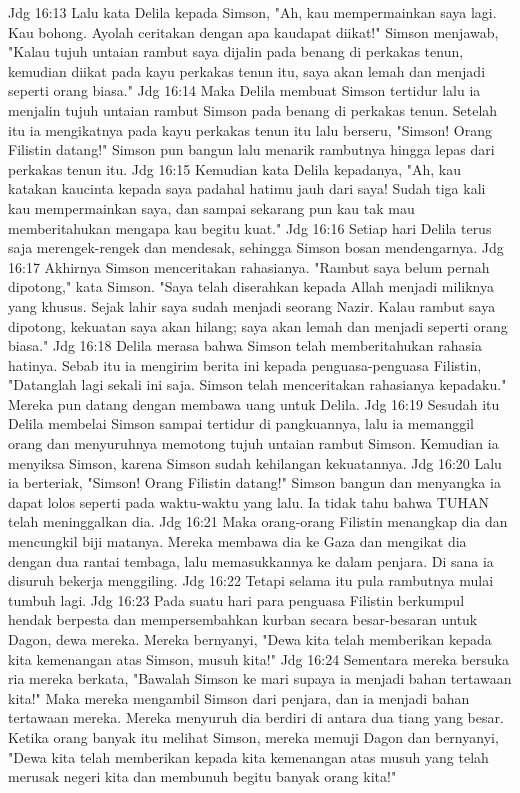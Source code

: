 Jdg 16:13  Lalu kata Delila kepada Simson, "Ah, kau mempermainkan saya lagi. Kau bohong. Ayolah ceritakan dengan apa kaudapat diikat!" Simson menjawab, "Kalau tujuh untaian rambut saya dijalin pada benang di perkakas tenun, kemudian diikat pada kayu perkakas tenun itu, saya akan lemah dan menjadi seperti orang biasa."
Jdg 16:14  Maka Delila membuat Simson tertidur lalu ia menjalin tujuh untaian rambut Simson pada benang di perkakas tenun. Setelah itu ia mengikatnya pada kayu perkakas tenun itu lalu berseru, "Simson! Orang Filistin datang!" Simson pun bangun lalu menarik rambutnya hingga lepas dari perkakas tenun itu.
Jdg 16:15  Kemudian kata Delila kepadanya, "Ah, kau katakan kaucinta kepada saya padahal hatimu jauh dari saya! Sudah tiga kali kau mempermainkan saya, dan sampai sekarang pun kau tak mau memberitahukan mengapa kau begitu kuat."
Jdg 16:16  Setiap hari Delila terus saja merengek-rengek dan mendesak, sehingga Simson bosan mendengarnya.
Jdg 16:17  Akhirnya Simson menceritakan rahasianya. "Rambut saya belum pernah dipotong," kata Simson. "Saya telah diserahkan kepada Allah menjadi miliknya yang khusus. Sejak lahir saya sudah menjadi seorang Nazir. Kalau rambut saya dipotong, kekuatan saya akan hilang; saya akan lemah dan menjadi seperti orang biasa."
Jdg 16:18  Delila merasa bahwa Simson telah memberitahukan rahasia hatinya. Sebab itu ia mengirim berita ini kepada penguasa-penguasa Filistin, "Datanglah lagi sekali ini saja. Simson telah menceritakan rahasianya kepadaku." Mereka pun datang dengan membawa uang untuk Delila.
Jdg 16:19  Sesudah itu Delila membelai Simson sampai tertidur di pangkuannya, lalu ia memanggil orang dan menyuruhnya memotong tujuh untaian rambut Simson. Kemudian ia menyiksa Simson, karena Simson sudah kehilangan kekuatannya.
Jdg 16:20  Lalu ia berteriak, "Simson! Orang Filistin datang!" Simson bangun dan menyangka ia dapat lolos seperti pada waktu-waktu yang lalu. Ia tidak tahu bahwa TUHAN telah meninggalkan dia.
Jdg 16:21  Maka orang-orang Filistin menangkap dia dan mencungkil biji matanya. Mereka membawa dia ke Gaza dan mengikat dia dengan dua rantai tembaga, lalu memasukkannya ke dalam penjara. Di sana ia disuruh bekerja menggiling.
Jdg 16:22  Tetapi selama itu pula rambutnya mulai tumbuh lagi.
Jdg 16:23  Pada suatu hari para penguasa Filistin berkumpul hendak berpesta dan mempersembahkan kurban secara besar-besaran untuk Dagon, dewa mereka. Mereka bernyanyi, "Dewa kita telah memberikan kepada kita kemenangan atas Simson, musuh kita!"
Jdg 16:24  Sementara mereka bersuka ria mereka berkata, "Bawalah Simson ke mari supaya ia menjadi bahan tertawaan kita!" Maka mereka mengambil Simson dari penjara, dan ia menjadi bahan tertawaan mereka. Mereka menyuruh dia berdiri di antara dua tiang yang besar. Ketika orang banyak itu melihat Simson, mereka memuji Dagon dan bernyanyi, "Dewa kita telah memberikan kepada kita kemenangan atas musuh yang telah merusak negeri kita dan membunuh begitu banyak orang kita!"
